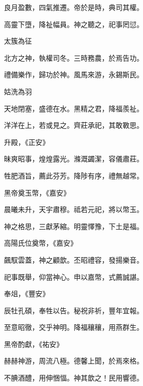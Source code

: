 \begin{pinyinscope}
 良月盈數，四氣推遷。帝於是時，典司其權。



 高靈下墮，降祉幅員。神之聽之，祀事罔愆。



 太簇為征



 北方之神，執權司冬。三時務農，於焉告功。



 禮備樂作，歸功於神。風馬來游，永錫斯民。



 姑洗為羽



 天地閉塞，盛德在水。黑精之君，降福羨祉。



 洋洋在上，若或見之。齊莊承祀，其敢斁思。



 升殿，《正安》



 昧爽昭事，煌煌露光。滌溉蠲潔，容儀肅莊。



 牲肥酒旨，薦此芬芳。降陟有序，禮無越常。



 黑帝奠玉幣，《嘉安》



 晨曦未升，天宇肅穆。祗若元祀，將以幣玉。



 神之格思，三獻茅縮。明靈懌豫，下土是福。



 高陽氏位奠幣，《嘉安》



 飆馭雲蓋，神之顧歆。丕昭禮容，發揚樂音。



 祀事既舉，仰當神心。申以嘉幣，式薦誠諶。



 奉俎，《豐安》



 辰牡孔碩，奉牲以告。秘祝非祈，豐年宜報。



 至意昭徹，交乎神明。降福穰穰，用燕群生。



 黑帝酌獻，《祐安》



 赫赫神游，周流八極。德馨上聞，於焉來格。



 不腆酒醴，用伸悃愊。神其歆之！民用響德。




\end{pinyinscope}
